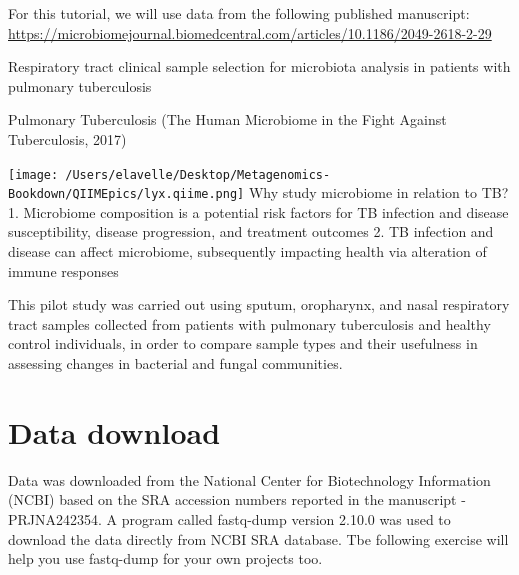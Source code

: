 \documentclass[
]{book}
\begin{document}
For this tutorial, we will use data from the following published manuscript:
\url{https://microbiomejournal.biomedcentral.com/articles/10.1186/2049-2618-2-29}

Respiratory tract clinical sample selection for microbiota analysis in patients with pulmonary tuberculosis

Pulmonary Tuberculosis (The Human Microbiome in the Fight Against Tuberculosis, 2017)

\texttt{[image: /Users/elavelle/Desktop/Metagenomics-Bookdown/QIIMEpics/lyx.qiime.png]}
Why study microbiome in relation to TB?
1. Microbiome composition is a potential risk factors for TB infection and disease susceptibility, disease progression,
and treatment outcomes
2. TB infection and disease can affect microbiome, subsequently impacting health via alteration of immune responses

This pilot study was carried out using sputum, oropharynx, and nasal respiratory tract samples collected from patients
with pulmonary tuberculosis and healthy control individuals, in order to compare sample types and their usefulness in
assessing changes in bacterial and fungal communities.

\hypertarget{data-download}{%
\section{Data download}\label{data-download}}

Data was downloaded from the National Center for Biotechnology Information (NCBI) based on the SRA accession
numbers reported in the manuscript - PRJNA242354.
A program called fastq-dump version 2.10.0 was used to download the data directly from NCBI SRA database. Tbe
following exercise will help you use fastq-dump for your own projects too.
\end{document}
